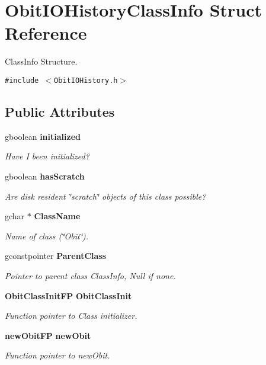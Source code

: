 \section{Obit\-IOHistory\-Class\-Info Struct Reference}
\label{structObitIOHistoryClassInfo}
Class\-Info Structure.  


{\tt \#include $<$Obit\-IOHistory.h$>$}

\subsection*{Public Attributes}
\begin{CompactItemize}
\item 
gboolean {\bf initialized}
\begin{CompactList}\small\item\em Have I been initialized? \item\end{CompactList}\item 
gboolean {\bf has\-Scratch}
\begin{CompactList}\small\item\em Are disk resident \char`\"{}scratch\char`\"{} objects of this class possible? \item\end{CompactList}\item 
gchar $\ast$ {\bf Class\-Name}
\begin{CompactList}\small\item\em Name of class (\char`\"{}Obit\char`\"{}). \item\end{CompactList}\item 
gconstpointer {\bf Parent\-Class}
\begin{CompactList}\small\item\em Pointer to parent class Class\-Info, Null if none. \item\end{CompactList}\item 
{\bf Obit\-Class\-Init\-FP} {\bf Obit\-Class\-Init}
\begin{CompactList}\small\item\em Function pointer to Class initializer. \item\end{CompactList}\item 
{\bf new\-Obit\-FP} {\bf new\-Obit}
\begin{CompactList}\small\item\em Function pointer to new\-Obit. \item\end{CompactList}\item 

\end{CompactItemize}
